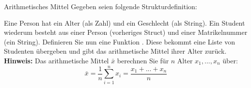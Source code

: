 \documentclass{../preamble}
\begin{document}
\clearpage

\begin{task}[credit = \stars{3}{3}]{Arithmetisches Mittel}
	Gegeben seien folgende Strukturdefinition:
	
	Eine Person hat ein Alter (als Zahl) und ein Geschlecht (als String). Ein Student wiederum besteht aus einer Person (vorheriges Struct) und einer Matrikelnummer (ein String).
	\br
	Definieren Sie nun eine Funktion . Diese bekommt eine Liste von Studenten übergeben und gibt das arithmetische Mittel ihrer Alter zurück.
	\br
	\textbf{Hinweis:} Das arithmetische Mittel \(\bar{x}\) berechnen Sie für \(n\) Alter \(x_1, ..., x_n\) über:
	\begin{equation*}
		\bar{x} = \frac{1}{n} \sum_{i = 1}^n x_i = \frac{x_1 + ... + x_n}{n}
	\end{equation*}

	\clearpage

	\begin{solution}
		
	\end{solution}
\end{task}
\end{document}
